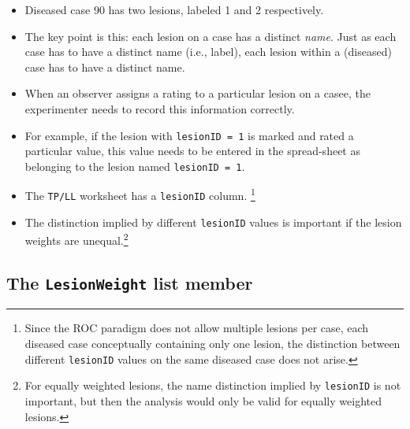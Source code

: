 \documentclass[]{book}
\newenvironment{Shaded}{\begin{snugshade}}{\end{snugshade}}
\newcommand{\CommentTok}[1]{\textcolor[rgb]{0.56,0.35,0.01}{\textit{#1}}}
\newcommand{\DecValTok}[1]{\textcolor[rgb]{0.00,0.00,0.81}{#1}}
\newcommand{\NormalTok}[1]{#1}
\newcommand{\OperatorTok}[1]{\textcolor[rgb]{0.81,0.36,0.00}{\textbf{#1}}}
\providecommand{\tightlist}{%
  \setlength{\itemsep}{0pt}\setlength{\parskip}{0pt}}
\let\rmarkdownfootnote\footnote%
\def\footnote{\protect\rmarkdownfootnote}
\begin{document}
\begin{Shaded}
\end{Shaded}

\begin{itemize}
\tightlist
\item
  Diseased case 90 has two lesions, labeled 1 and 2 respectively.
\item
  The key point is this: each lesion on a case has a distinct \emph{name}. Just as each case has to have a distinct name (i.e., label), each lesion within a (diseased) case has to have a distinct name.
\item
  When an observer assigns a rating to a particular lesion on a casee, the experimenter needs to record this information correctly.
\item
  For example, if the lesion with \texttt{lesionID\ =\ 1} is marked and rated a particular value, this value needs to be entered in the spread-sheet as belonging to the lesion named \texttt{lesionID\ =\ 1}.
\item
  The \texttt{TP/LL} worksheet has a \texttt{lesionID} column. \footnote{Since the ROC paradigm does not allow multiple lesions per case, each diseased case conceptually containing only one lesion, the distinction between different \texttt{lesionID} values on the same diseased case does not arise.}
\item
  The distinction implied by different \texttt{lesionID} values is important if the lesion weights are unequal.\footnote{For equally weighted lesions, the name distinction implied by \texttt{lesionID} is not important, but then the analysis would only be valid for equally weighted lesions.}
\end{itemize}

\hypertarget{the-lesionweight-list-member}{%
\subsection{\texorpdfstring{The \texttt{LesionWeight} list member}{The LesionWeight list member}}\label{the-lesionweight-list-member}}
\end{document}
